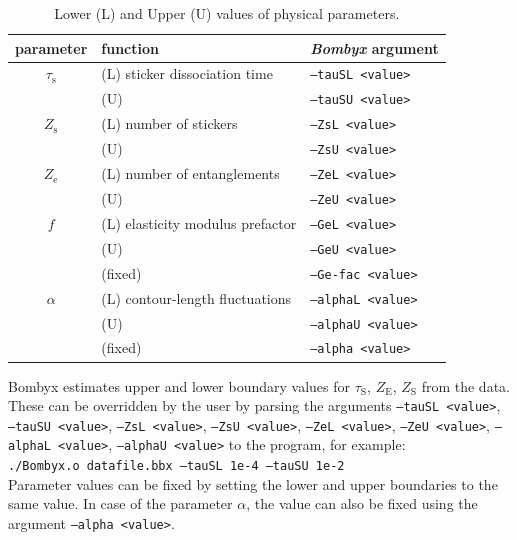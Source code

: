 \documentclass[  superscriptaddress]{revtex4}
\begin{document}
\begin{table}[h]
\centering
\caption{Lower (L) and Upper (U) values of physical parameters.}
\begin{tabular}{ |c|l|l| } 
 \hline
 parameter & function & \emph{Bombyx} argument \\ 
 \hline
 $\tau_\mathrm{s}$        & (L) sticker dissociation time        & \texttt{--tauSL   <value>} \\
                          & (U)                                  & \texttt{--tauSU   <value>} \\
 $Z_\mathrm{s}$           & (L) number of stickers               & \texttt{--ZsL     <value>} \\ 
                          & (U)                                  & \texttt{--ZsU     <value>} \\
 $Z_\mathrm{e}$           & (L) number of entanglements          & \texttt{--ZeL     <value>} \\ 
                          & (U)                                  & \texttt{--ZeU     <value>} \\
 $f$                      & (L) elasticity modulus prefactor     & \texttt{--GeL     <value>} \\ 
                          & (U)                                  & \texttt{--GeU     <value>} \\
                          & (fixed)                              & \texttt{--Ge-fac  <value>} \\
 $\alpha$                 & (L) contour-length fluctuations      & \texttt{--alphaL  <value>} \\ 
                          & (U)                                  & \texttt{--alphaU  <value>} \\ 
                          & (fixed)                              & \texttt{--alpha   <value>} \\
 \hline
\end{tabular}
\end{table}




Bombyx estimates upper and lower boundary values for $\tau_\mathrm{S}$, $Z_\mathrm{E}$, $Z_\mathrm{S}$ from the data.
These can be overridden by the user by parsing the arguments \texttt{--tauSL <value>},  \texttt{--tauSU <value>}, \texttt{--ZsL <value>},  \texttt{--ZsU <value>}, \texttt{--ZeL <value>},  \texttt{--ZeU <value>}, \texttt{--alphaL <value>},  \texttt{--alphaU <value>} to the program, for example:\\
\texttt{./Bombyx.o datafile.bbx --tauSL 1e-4 --tauSU 1e-2}\\
Parameter values can be fixed by setting the lower and upper boundaries to the same value.
In case of the parameter $\alpha$, the value can also be fixed using the argument \texttt{--alpha <value>}. 
\end{document}
